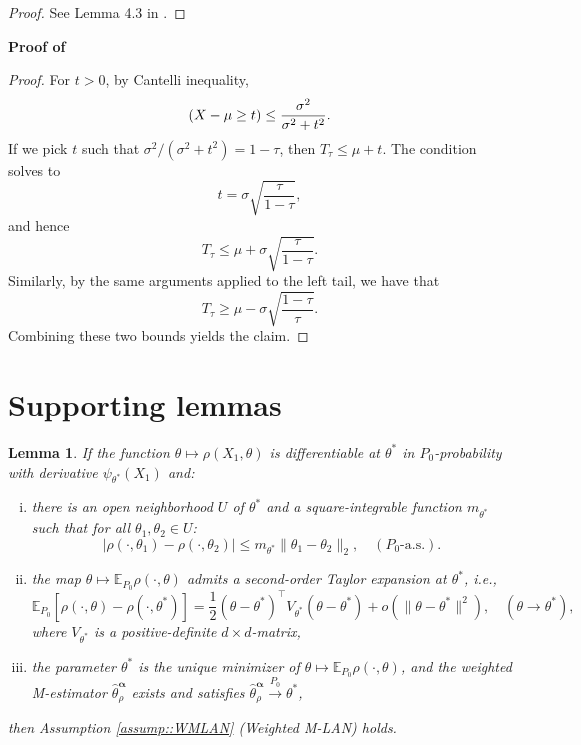 \documentclass[11pt, oneside]{amsart}
\newtheorem{lemma}{Lemma}
\theoremstyle{definition}   %
\let\P\relax
\newcommand{\P}{\mathbb{P}}
\newcommand{\E}{\mathbb{E}}
\newcommand{\loss}{\rho}
\newcommand{\mestimator}{\hat{\theta}^{\boldsymbol{\alpha}}_{\loss }}
\begin{document}
\begin{proof}
    See Lemma 4.3 in \cite{huber1984}.
\end{proof}
%
%
\noindent \textbf{Proof of }

\begin{proof}
    For \( t > 0\), by Cantelli inequality,
    \[
        \P(X - \mu \geq t) \leq \frac{\sigma^2}{\sigma^2 + t^2}.
    \]
    If we pick \( t \) such that \( \sigma^2 /(\sigma^2 + t^2) = 1 - \tau\), then \( T_\tau \leq \mu +t.\) The condition solves to 
    \[
        t = \sigma \sqrt{\frac{\tau}{1-\tau}},
    \]
    and hence 
    \[
        T_\tau \leq \mu +\sigma \sqrt{\frac{\tau}{1-\tau}}.
    \]
    Similarly, by the same arguments applied to the left tail, we have that
    \[
        T_\tau \geq \mu - \sigma \sqrt{\frac{1-\tau}{\tau}}.
    \]
    Combining these two bounds yields the claim.
\end{proof}
%


\section{Supporting lemmas} \label{appendix::supporting-lemmas}

\begin{lemma}
\label{lemma::WMLAN_conditions}
    If the function $\theta \mapsto \loss(X_1, \theta)$ is differentiable at $\theta^*$ in $P_0$-probability with derivative $\psi_{\theta^*}(X_1)$ and:
    \begin{enumerate}[(i)]
        \item there is an open neighborhood $U$ of $\theta^*$ and a square-integrable function $m_{\theta^*}$ such that for all $\theta_1, \theta_2 \in U$:
        \[
        \left| \loss ( \cdot, \theta_1) - \loss( \cdot, \theta_2) \right |  \leq m_{\theta^*} \|\theta_1 - \theta_2\|_2, \quad (P_0 \text{-a.s.}).
        \]
        
        \item the map \( \theta \mapsto \E_{P_0} \rho(\cdot, \theta) \) admits a second-order Taylor expansion at \( \theta^* \), i.e.,
        \[
        \E_{P_0} [\loss( \cdot, \theta) - \loss( \cdot, \theta^*) ] = \frac{1}{2} (\theta - \theta^*)^\top V_{\theta^*} (\theta - \theta^*) + o(\|\theta - \theta^*\|^2), \quad (\theta \rightarrow \theta^*),
        \]
        where $V_{\theta^*}$ is a positive-definite $d \times d$-matrix,

        \item
        the parameter $\theta^*$ is the unique minimizer of $\theta \mapsto \E_{P_0}\rho(\cdot,\theta)$, and the weighted M-estimator $\mestimator$ exists and satisfies $\mestimator \overset{P_0}{\rightarrow} \theta^*$,
    \end{enumerate}
    then Assumption \ref{assump::WMLAN} (Weighted M-LAN) holds.
\end{lemma}
%
\end{document}
